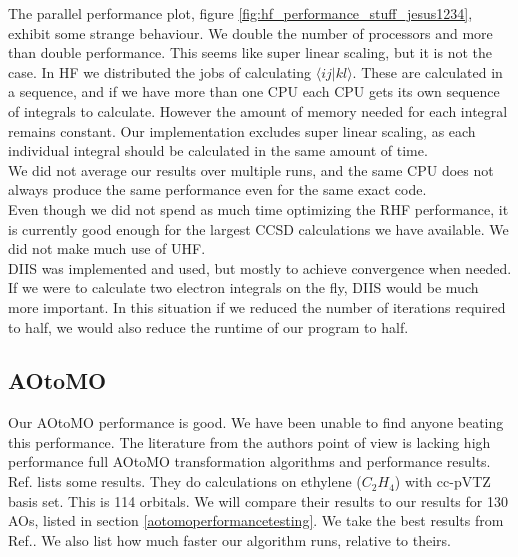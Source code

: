 \documentclass[a4paper,norsk,11pt,twoside]{report}
\begin{document}
The parallel performance plot, figure \ref{fig:hf_performance_stuff_jesus1234}, exhibit some strange behaviour. We double the number of processors and more than double performance. This seems like super linear scaling, but it is not the case. In HF we distributed the jobs of calculating $\langle i j | k l \rangle$. These are calculated in a sequence, and if we have more than one CPU each CPU gets its own sequence of integrals to calculate. However the amount of memory needed for each integral remains constant. Our implementation excludes super linear scaling, as each individual integral should be calculated in the same amount of time. \\

We did not average our results over multiple runs, and the same CPU does not always produce the same performance even for the same exact code. \\

Even though we did not spend as much time optimizing the RHF performance, it is currently good enough for the largest CCSD calculations we have available. We did not make much use of UHF. \\

DIIS was implemented and used, but mostly to achieve convergence when needed. If we were to calculate two electron integrals on the fly, DIIS would be much more important. In this situation if we reduced the number of iterations required to half, we would also reduce the runtime of our program to half. 

\subsection{AOtoMO}
Our AOtoMO performance is good. We have been unable to find anyone beating this performance. The literature from the authors point of view is lacking high performance full AOtoMO transformation algorithms and performance results. \\

Ref.\cite{aotomo_2_cite} lists some results. They do calculations on ethylene ($C_2 H_4$) with cc-pVTZ basis set. This is 114 orbitals. We will compare their results to our results for 130 AOs, listed in section \ref{aotomoperformancetesting}. We take the best results from Ref.\cite{aotomo_2_cite}. We also list how much faster our algorithm runs, relative to theirs. \\
\end{document}
